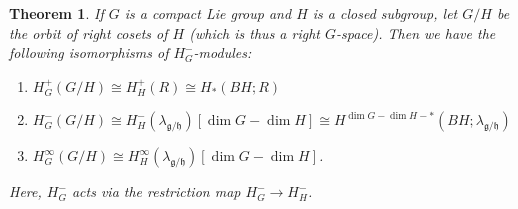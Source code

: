 \documentclass{memo-l}
\newtheorem{theorem}{Theorem}[chapter]
\theoremstyle{definition}
\theoremstyle{remark}
\numberwithin{section}{chapter}
\numberwithin{equation}{chapter}
\begin{document}
\begin{theorem}\label{orbitcalc}If $G$ is a compact Lie group and $H$ is a closed subgroup, let $G/H$ be the orbit of right cosets of $H$ (which is thus a right $G$-space). Then we have the following isomorphisms of $H_G^-$-modules: \begin{enumerate}
    \item $H_G^+(G/H) \cong H_H^+(R)\cong H_*(BH;R)$\\
    \item $H_G^-(G/H) \cong H_H^-(\lambda_{\mathfrak g/\mathfrak h})[\dim G - \dim H] \cong H^{\dim G - \dim H-*}(BH;\lambda_{\mathfrak g/\mathfrak h})$\\
    \item $H_G^\infty(G/H) \cong H_H^\infty(\lambda_{\mathfrak g/\mathfrak h})[\dim G - \dim H]$.
\end{enumerate}

Here, $H_G^-$ acts via the restriction map $H_G^- \to H_H^-$. 
\end{theorem}
\end{document}
